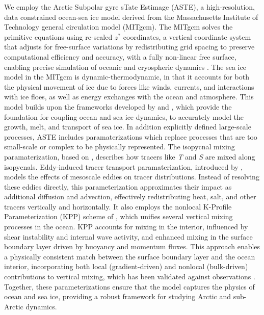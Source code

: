 \documentclass[draft]{agujournal2019}
\begin{document}
We employ the Arctic Subpolar gyre sTate Estimage (ASTE), a high-resolution, data constrained ocean-sea ice model derived from the Massachusetts Institute of Technology general circulation model (MITgcm). The MITgcm solves the primitive equations using re-scaled $z^*$ coordinates, a vertical coordinate system that adjusts for free-surface variations by redistributing grid spacing to preserve computational efficiency and accuracy, with a fully non-linear free surface, enabling precise simulation of oceanic and cryospheric dynamics \cite{campin2008}. The sea ice model in the MITgcm is dynamic-thermodynamic, in that it accounts for both the physical movement of ice due to forces like winds, currents, and interactions with ice floes, as well as energy exchanges with the ocean and atmosphere. This model builds upon the frameworks developed by  and , which provide the foundation for coupling ocean and sea ice dynamics, to accurately model the growth, melt, and transport of sea ice. In addition explicitly defined large-scale processes, ASTE includes paramaterizations which replace processes that are too small-scale or complex to be physically represented. The isopycnal mixing paramaterization, based on , describes how tracers like \emph{T} and \emph{S} are mixed along isopycnals. Eddy-induced tracer transport paramaterization, introduced by , models the effects of mesoscale eddies on tracer distributions. Instead of resolving these eddies directly, this parameterization approximates their impact as additional diffusion and advection, effectively redistributing heat, salt, and other tracers vertically and horizontally. It also employs the nonlocal K-Profile Parameterization (KPP) scheme of , which unifies several vertical mixing processes in the ocean. KPP accounts for mixing in the interior, influenced by shear instability and internal wave activity, and enhanced mixing in the surface boundary layer driven by buoyancy and momentum fluxes. This approach enables a physically consistent match between the surface boundary layer and the ocean interior, incorporating both local (gradient-driven) and nonlocal (bulk-driven) contributions to vertical mixing, which has been validated against observations . Together, these parameterizations ensure that the model captures the physics of ocean and sea ice, providing a robust framework for studying Arctic and sub-Arctic dynamics.
\end{document}
